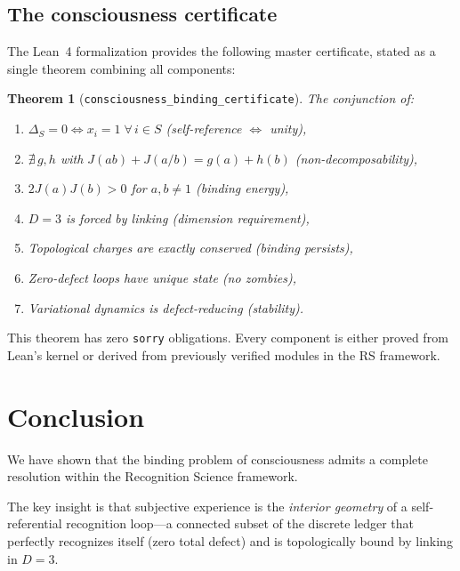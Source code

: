 \documentclass[11pt,a4paper]{article}
\theoremstyle{plain}
\newtheorem{theorem}{Theorem}[section]
\theoremstyle{definition}
\theoremstyle{remark}
\newcommand{\Jcost}{J}
\begin{document}
\subsection{The consciousness certificate}

The Lean~4 formalization provides the following master certificate,
stated as a single theorem combining all components:

\begin{theorem}[\texttt{consciousness\_binding\_certificate}]
\label{thm:certificate}
The conjunction of:
\begin{enumerate}[nosep,label=(\arabic*)]
\item $\Delta_S = 0 \iff x_i = 1\;\forall\,i \in S$
  \;\textup{(self-reference $\iff$ unity)},
\item $\nexists\, g,h$ with $\Jcost(ab) + \Jcost(a/b) = g(a) + h(b)$
  \;\textup{(non-decomposability)},
\item $2\Jcost(a)\Jcost(b) > 0$ for $a,b \neq 1$
  \;\textup{(binding energy)},
\item $D = 3$ is forced by linking
  \;\textup{(dimension requirement)},
\item Topological charges are exactly conserved
  \;\textup{(binding persists)},
\item Zero-defect loops have unique state
  \;\textup{(no zombies)},
\item Variational dynamics is defect-reducing
  \;\textup{(stability)}.
\end{enumerate}
\end{theorem}

This theorem has zero \texttt{sorry} obligations.  Every component is
either proved from Lean's kernel or derived from previously verified
modules in the RS framework.

\section{Conclusion}
\label{sec:conclusion}

We have shown that the binding problem of consciousness admits a
complete resolution within the Recognition Science framework.

The key insight is that subjective experience is the \emph{interior
geometry} of a self-referential recognition loop---a connected subset
of the discrete ledger that perfectly recognizes itself (zero total
defect) and is topologically bound by linking in $D = 3$.
\end{document}
